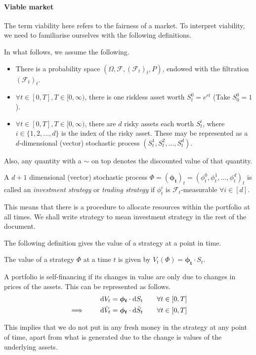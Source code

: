 \paragraph{Viable market}
The term viability here refers to the fairness of a market. To interpret viability, we need to familiarise ourselves with the following definitions.

In what follows, we assume the following.
\begin{itemize}
	\item There is a probability space $ (\Omega, \mathcal{F}, (\mathcal{F}_t)_t, P) $, endowed with the filtration $ (\mathcal{F}_t)_t $.
	\item $ \forall t \in [0, T], T \in [0, \infty) $, there is one riskless asset worth $ S_t^0 = e^{rt} $ (Take $ S_0^0 = 1 $).
	\item $ \forall t \in [0, T], T \in [0, \infty) $, there are $ d $ risky assets each worth $ S_t^i $, where $ i \in \{ 1, 2, \dots, d \} $ is the index of the risky asset. These may be represented as a $ d $-dimensional (vector) stochastic process $ ( S_t^1, S_t^2, \dots, S_t^d ) $.
\end{itemize}

Also, any quantity with a $ \sim $ on top denotes the discounted value of that quantity.


\begin{dfn}
	A $ d + 1 $ dimensional (vector) stochastic process $ \Phi = (\bm{\phi_t})_t = (\phi_t^0, \phi_t^1, \dots, \phi_t^d)_t $ is called an \emph{investment strategy} or \emph{trading strategy} if $ \phi_t^i $ is $ \mathcal{F}_t $-measurable $ \forall i \in [d] $.
\end{dfn}
This means that there is a procedure to allocate resources within the portfolio at all times. We shall write strategy to mean investment strategy in the rest of the document.

The following definition gives the value of a strategy at a point in time.
\begin{dfn}
	The value of a strategy $ \Phi $ at a time $ t $ is given by $ V_t( \Phi ) = \bm{\phi_t} \cdot S_t $.
\end{dfn}

\begin{dfn}
	A portfolio is self-financing if its changes in value are only due to changes in prices of the assets. This can be represented as follows.
	\begin{subequations}
		\begin{align}
			\dif V_t &= \bm{\phi_t} \cdot \dif S_t \qquad \forall t \in [0, T]  \\
			\implies  \qquad  \dif \tilde{V}_t &= \bm{\phi_t} \cdot \dif \tilde{S}_t \qquad \forall t \in [0, T]
		\end{align}
	\end{subequations}
\end{dfn}
This implies that we do not put in any fresh money in the strategy at any point of time, apart from what is generated due to the change is values of the underlying assets.

